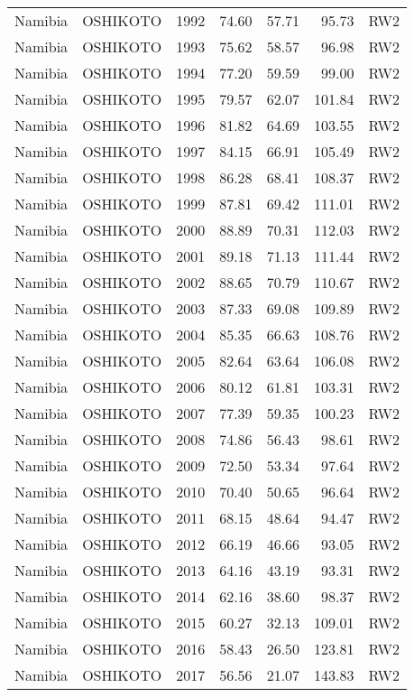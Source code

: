 \begin{longtable}{lllrrrl}
  Namibia & OSHIKOTO & 1992 & 74.60 & 57.71 & 95.73 & RW2 \\ 
  Namibia & OSHIKOTO & 1993 & 75.62 & 58.57 & 96.98 & RW2 \\ 
  Namibia & OSHIKOTO & 1994 & 77.20 & 59.59 & 99.00 & RW2 \\ 
  Namibia & OSHIKOTO & 1995 & 79.57 & 62.07 & 101.84 & RW2 \\ 
  Namibia & OSHIKOTO & 1996 & 81.82 & 64.69 & 103.55 & RW2 \\ 
  Namibia & OSHIKOTO & 1997 & 84.15 & 66.91 & 105.49 & RW2 \\ 
  Namibia & OSHIKOTO & 1998 & 86.28 & 68.41 & 108.37 & RW2 \\ 
  Namibia & OSHIKOTO & 1999 & 87.81 & 69.42 & 111.01 & RW2 \\ 
  Namibia & OSHIKOTO & 2000 & 88.89 & 70.31 & 112.03 & RW2 \\ 
  Namibia & OSHIKOTO & 2001 & 89.18 & 71.13 & 111.44 & RW2 \\ 
  Namibia & OSHIKOTO & 2002 & 88.65 & 70.79 & 110.67 & RW2 \\ 
  Namibia & OSHIKOTO & 2003 & 87.33 & 69.08 & 109.89 & RW2 \\ 
  Namibia & OSHIKOTO & 2004 & 85.35 & 66.63 & 108.76 & RW2 \\ 
  Namibia & OSHIKOTO & 2005 & 82.64 & 63.64 & 106.08 & RW2 \\ 
  Namibia & OSHIKOTO & 2006 & 80.12 & 61.81 & 103.31 & RW2 \\ 
  Namibia & OSHIKOTO & 2007 & 77.39 & 59.35 & 100.23 & RW2 \\ 
  Namibia & OSHIKOTO & 2008 & 74.86 & 56.43 & 98.61 & RW2 \\ 
  Namibia & OSHIKOTO & 2009 & 72.50 & 53.34 & 97.64 & RW2 \\ 
  Namibia & OSHIKOTO & 2010 & 70.40 & 50.65 & 96.64 & RW2 \\ 
  Namibia & OSHIKOTO & 2011 & 68.15 & 48.64 & 94.47 & RW2 \\ 
  Namibia & OSHIKOTO & 2012 & 66.19 & 46.66 & 93.05 & RW2 \\ 
  Namibia & OSHIKOTO & 2013 & 64.16 & 43.19 & 93.31 & RW2 \\ 
  Namibia & OSHIKOTO & 2014 & 62.16 & 38.60 & 98.37 & RW2 \\ 
  Namibia & OSHIKOTO & 2015 & 60.27 & 32.13 & 109.01 & RW2 \\ 
  Namibia & OSHIKOTO & 2016 & 58.43 & 26.50 & 123.81 & RW2 \\ 
  Namibia & OSHIKOTO & 2017 & 56.56 & 21.07 & 143.83 & RW2 \\ 

\end{longtable}
